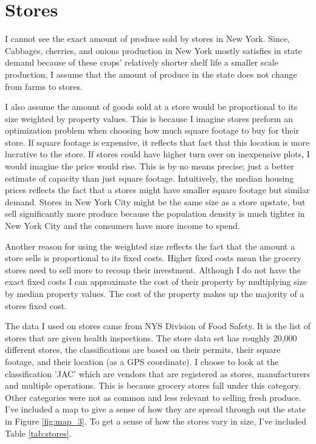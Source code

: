 \documentclass{report}
\begin{document}
\section{Stores}

I cannot see the exact amount of produce sold by stores in New York. Since, Cabbages, cherries, and onions production in New York mostly satisfies in state demand because of these crops' relatively shorter shelf life a smaller scale production, I assume that the amount of produce in the state does not change from farms to stores. 

I also assume the amount of goods sold at a store would be proportional to its size weighted by property values. This is because I imagine stores preform an optimization problem when choosing how much square footage to buy for their store. If square footage is expensive, it reflects that fact that this location is more lucrative to the store. If stores could have higher turn over on inexpensive plots, I would imagine the price would rise. This is by no means precise; just a better estimate of capacity than just square footage. Intuitively, the median housing prices reflects the fact that a stores might have smaller square footage but similar demand. Stores in New York City might be the same size as a store upstate, but sell significantly more produce because the population density is much tighter in New York City and the consumers have more income to spend.  

Another reason for using the weighted size reflects the fact that the amount a store sells is proportional to its fixed costs. Higher fixed costs mean the grocery stores need to sell more to recoup their investment. Although I do not have the exact fixed costs I can approximate the cost of their property by multiplying size by median property values. The cost of the property makes up the majority of a stores fixed cost.

The data I used on stores came from NYS Division of Food Safety. It is the list of stores that are given health inspections. The store data set has roughly 20,000 different stores, the classifications are based on their permits, their square footage, and their location (as a GPS coordinate). I choose to look at the classification 'JAC' which are vendors that are registered as stores, manufacturers and multiple operations. This is because grocery stores fall under this category. Other categories were not as common and less relevant to selling fresh produce. I've included a map to give a sense of how they are spread through out the state in Figure \ref{fig:map_3}. To get a sense of how the stores vary in size, I've included Table \ref{tab:stores}.
\end{document}
